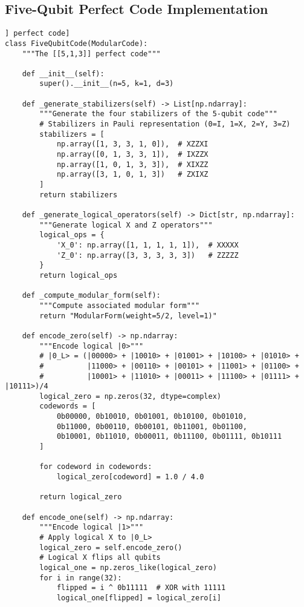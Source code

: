 \documentclass[12pt,a4paper]{article}
\begin{document}
\subsection{Five-Qubit Perfect Code Implementation}

\begin{lstlisting}[style=python,caption=Implementation of the [[5,1,3]] perfect code]
class FiveQubitCode(ModularCode):
    """The [[5,1,3]] perfect code"""
    
    def __init__(self):
        super().__init__(n=5, k=1, d=3)
    
    def _generate_stabilizers(self) -> List[np.ndarray]:
        """Generate the four stabilizers of the 5-qubit code"""
        # Stabilizers in Pauli representation (0=I, 1=X, 2=Y, 3=Z)
        stabilizers = [
            np.array([1, 3, 3, 1, 0]),  # XZZXI
            np.array([0, 1, 3, 3, 1]),  # IXZZX  
            np.array([1, 0, 1, 3, 3]),  # XIXZZ
            np.array([3, 1, 0, 1, 3])   # ZXIXZ
        ]
        return stabilizers
    
    def _generate_logical_operators(self) -> Dict[str, np.ndarray]:
        """Generate logical X and Z operators"""
        logical_ops = {
            'X_0': np.array([1, 1, 1, 1, 1]),  # XXXXX
            'Z_0': np.array([3, 3, 3, 3, 3])   # ZZZZZ
        }
        return logical_ops
    
    def _compute_modular_form(self):
        """Compute associated modular form"""
        return "ModularForm(weight=5/2, level=1)"
    
    def encode_zero(self) -> np.ndarray:
        """Encode logical |0>"""
        # |0_L> = (|00000> + |10010> + |01001> + |10100> + |01010> + 
        #          |11000> + |00110> + |00101> + |11001> + |01100> + 
        #          |10001> + |11010> + |00011> + |11100> + |01111> + |10111>)/4
        logical_zero = np.zeros(32, dtype=complex)
        codewords = [
            0b00000, 0b10010, 0b01001, 0b10100, 0b01010,
            0b11000, 0b00110, 0b00101, 0b11001, 0b01100,
            0b10001, 0b11010, 0b00011, 0b11100, 0b01111, 0b10111
        ]
        
        for codeword in codewords:
            logical_zero[codeword] = 1.0 / 4.0
        
        return logical_zero
    
    def encode_one(self) -> np.ndarray:
        """Encode logical |1>"""
        # Apply logical X to |0_L>
        logical_zero = self.encode_zero()
        # Logical X flips all qubits
        logical_one = np.zeros_like(logical_zero)
        for i in range(32):
            flipped = i ^ 0b11111  # XOR with 11111
            logical_one[flipped] = logical_zero[i]
        

\end{lstlisting}
\end{document}
